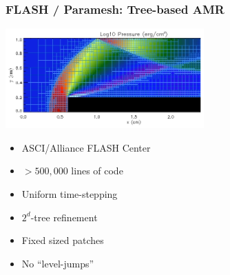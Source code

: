 \begin{frame}[fragile] \frametitle{FLASH / Paramesh: Tree-based AMR}
\centerline{\includegraphics[width=3.0in]{paramesh.png}}
\begin{minipage}{2.3in}
\begin{itemize}
\item ASCI/Alliance FLASH Center
\item $>500,000$ lines of code
\item Uniform time-stepping
\end{itemize}
\end{minipage}
\begin{minipage}{1.8in}
\begin{itemize}
\item $2^d$-tree refinement 
\item Fixed sized patches
\item No ``level-jumps''
\end{itemize}
\end{minipage}

\end{frame}

% 
